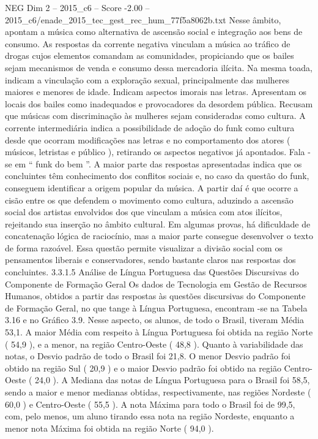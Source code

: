 \begin{textsample}{NEG Dim 2 – 2015\_c6 – Score -2.00 – 2015\_c6/enade\_2015\_tec\_gest\_rec\_hum\_77f5a8062b.txt}
Nesse âmbito, apontam a música como alternativa de ascensão social e integração aos bens de consumo.
As respostas da corrente negativa vinculam a música ao tráfico de drogas cujos elementos comandam as comunidades, propiciando que os bailes sejam mecanismos de venda e consumo dessa mercadoria ilícita.
Na mesma toada, indicam a vinculação com a exploração sexual, principalmente das mulheres maiores e menores de idade.
Indicam aspectos imorais nas letras.
Apresentam os locais dos bailes como inadequados e provocadores da desordem pública.
Recusam que músicas com discriminação às mulheres sejam consideradas como cultura.
A corrente intermediária indica a possibilidade de adoção do funk como cultura desde que ocorram modificações nas letras e no comportamento dos atores ( músicos, letristas e público ), retirando os aspectos negativos já apontados.
Fala -se em “ funk do bem ”.
A maior parte das respostas apresentadas indica que os concluintes têm conhecimento dos conflitos sociais e, no caso da questão do funk, conseguem identificar a origem popular da música.
A partir daí é que ocorre a cisão entre os que defendem o movimento como cultura, aduzindo a ascensão social dos artistas envolvidos dos que vinculam a música com atos ilícitos, rejeitando sua inserção no âmbito cultural.
Em algumas provas, há dificuldade de concatenação lógica de raciocínio, mas a maior parte consegue desenvolver o texto de forma razoável.
Essa questão permite visualizar a divisão social com os pensamentos liberais e conservadores, sendo bastante claros nas respostas dos concluintes. 3.3.1.5 Análise de Língua Portuguesa das Questões Discursivas do Componente de Formação Geral Os dados de Tecnologia em Gestão de Recursos Humanos, obtidos a partir das respostas às questões discursivas do Componente de Formação Geral, no que tange à Língua Portuguesa, encontram -se na Tabela 3.16 e no Gráfico 3.9.
Nesse aspecto, os alunos, de todo o Brasil, tiveram Média 53,1.
A maior Média com respeito à Língua Portuguesa foi obtida na região Norte ( 54,9 ), e a menor, na região Centro-Oeste ( 48,8 ).
Quanto à variabilidade das notas, o Desvio padrão de todo o Brasil foi 21,8.
O menor Desvio padrão foi obtido na região Sul ( 20,9 ) e o maior Desvio padrão foi obtido na região Centro-Oeste ( 24,0 ).
A Mediana das notas de Língua Portuguesa para o Brasil foi 58,5, sendo a maior e menor medianas obtidas, respectivamente, nas regiões Nordeste ( 60,0 ) e Centro-Oeste ( 55,5 ).
A nota Máxima para todo o Brasil foi de 99,5, com, pelo menos, um aluno tirando essa nota na região Nordeste, enquanto a menor nota Máxima foi obtida na região Norte ( 94,0 ).

\end{textsample}
